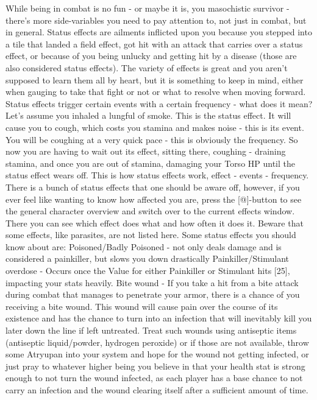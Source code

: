 \documentclass[11pt]{report}
\begin{document}
While being in combat is no fun - or maybe it is, you masochistic survivor - there's more side-variables you need to pay attention to, not just in combat, but in general. Status effects are ailments inflicted upon you because you stepped into a tile that landed a field effect, got hit with an attack that carries over a status effect, or because of you being unlucky and getting hit by a disease (those are also considered status effects). The variety of effects is great and you aren't supposed to learn them all by heart, but it is something to keep in mind, either when gauging to take that fight or not or what to resolve when moving forward.
Status effects trigger certain events with a certain frequency - what does it mean?
Let's assume you inhaled a lungful of smoke. This is the status effect. It will cause you to cough, which costs you stamina and makes noise - this is its event. You will be coughing at a very quick pace - this is obviously the frequency. So now you are having to wait out its effect, sitting there, coughing - draining stamina, and once you are out of stamina, damaging your Torso HP until the status effect wears off.
This is how status effects work, effect - events - frequency. There is a bunch of status effects that one should be aware off, however, if you ever feel like wanting to know how affected you are, press the [@]-button to see the general character overview and switch over to the current effects window. There you can see which effect does what and how often it does it. Beware that some effects, like parasites, are not listed here. Some status effects you should know about are:
Poisoned/Badly Poisoned - not only deals damage and is considered a painkiller, but slows you down drastically
Painkiller/Stimulant overdose - Occurs once the Value for either Painkiller or Stimulant hits [25], impacting your stats heavily.
Bite wound - If you take a hit from a bite attack during combat that manages to penetrate your armor, there is a chance of you receiving a bite wound. This wound will cause pain over the course of its existence and has the chance to turn into an infection that will inevitably kill you later down the line if left untreated. Treat such wounds using antiseptic items (antiseptic liquid/powder, hydrogen peroxide) or if those are not available, throw some Atryupan into your system and hope for the wound not getting infected, or just pray to whatever higher being you believe in that your health stat is strong enough to not turn the wound infected, as each player has a base chance to not carry an infection and the wound clearing itself after a sufficient amount of time.
\end{document}
